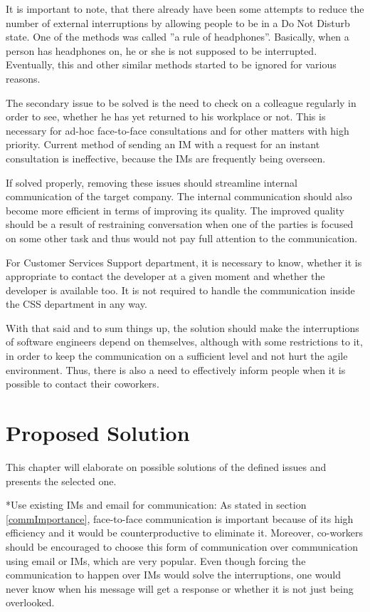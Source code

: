 \documentclass[11pt,singleside]{myfithesis2}
\makeatletter
\renewcommand\paragraph{
   \vspace{-10pt}
   \@startsection{paragraph}{4}{0mm}
      {\baselineskip}
      {- 5pt}
      {\normalfont\normalsize\bfseries}
}
\makeatother
\begin{document}
It is important to note, that there already have been some attempts to reduce the number of external interruptions by allowing people to be in a Do Not Disturb state. One of the methods was called ''a rule of headphones''. Basically, when a person has headphones on, he or she is not supposed to be interrupted. Eventually, this and other similar methods started to be ignored for various reasons.

The secondary issue to be solved is the need to check on a colleague regularly in order to see, whether he has yet returned to his workplace or not. This is necessary for ad-hoc face-to-face consultations and for other matters with high priority. Current method of sending an IM with a request for an instant consultation is ineffective, because the IMs are frequently being overseen.

If solved properly, removing these issues should streamline internal communication of the target company. The internal communication should also become more efficient in terms of improving its quality. The improved quality should be a result of restraining conversation when one of the parties is focused on some other task and thus would not pay full attention to the communication.

For Customer Services Support department, it is necessary to know, whether it is appropriate to contact the developer at a given moment and whether the developer is available too. It is not required to handle the communication inside the CSS department in any way.

With that said and to sum things up, the solution should make the interruptions of software engineers depend on themselves, although with some restrictions to it, in order to keep the communication on a sufficient level and not hurt the agile environment. Thus, there is also a need to effectively inform people when it is possible to contact their coworkers.


\chapter{Proposed Solution}\label{proposedSolution}
This chapter will elaborate on possible solutions of the defined issues and presents the selected one.

\paragraph*{Use existing IMs and email for communication: } As stated in section \ref{commImportance}, face-to-face communication is important because of its high efficiency and it would be counterproductive to eliminate it. Moreover, co-workers should be encouraged to choose this form of communication over communication using email or IMs, which are very popular. Even though forcing the communication to happen over IMs would solve the interruptions, one would never know when his message will get a response or whether it is not just being overlooked.
\end{document}
